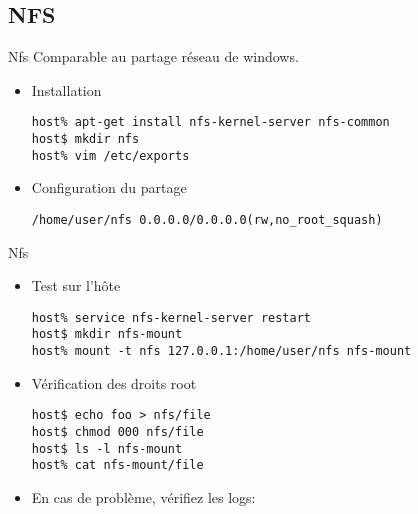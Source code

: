 \subsection{NFS}

\begin{frame}[fragile=singleslide]{Nfs}
  Comparable au partage réseau de windows.
  \begin{itemize}
  \item Installation
    \begin{lstlisting}
host% apt-get install nfs-kernel-server nfs-common
host$ mkdir nfs
host% vim /etc/exports
    \end{lstlisting} %
  \item Configuration du partage
    \begin{lstlisting}
/home/user/nfs 0.0.0.0/0.0.0.0(rw,no_root_squash)
    \end{lstlisting}
  \end{itemize}
\end{frame}

\begin{frame}[fragile=singleslide]{Nfs}
  \begin{itemize}
    \item Test sur l'hôte
      \begin{lstlisting}
host% service nfs-kernel-server restart
host$ mkdir nfs-mount
host% mount -t nfs 127.0.0.1:/home/user/nfs nfs-mount
      \end{lstlisting} %
    \item Vérification des droits root
      \begin{lstlisting}
host$ echo foo > nfs/file
host$ chmod 000 nfs/file
host$ ls -l nfs-mount
host% cat nfs-mount/file
      \end{lstlisting} %
     \item En cas de problème, vérifiez les logs: 
   \end{itemize}
\end{frame}  

